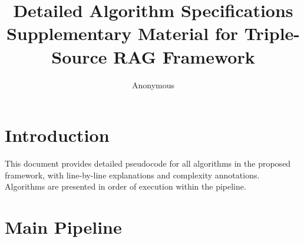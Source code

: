 \documentclass[11pt]{article}
\title{Detailed Algorithm Specifications\\
\large Supplementary Material for Triple-Source RAG Framework}
\author{Anonymous}
\date{}
\begin{document}
\maketitle

\section{Introduction}

This document provides detailed pseudocode for all algorithms in the proposed framework, with line-by-line explanations and complexity annotations. Algorithms are presented in order of execution within the pipeline.

\section{Main Pipeline}
\end{document}

